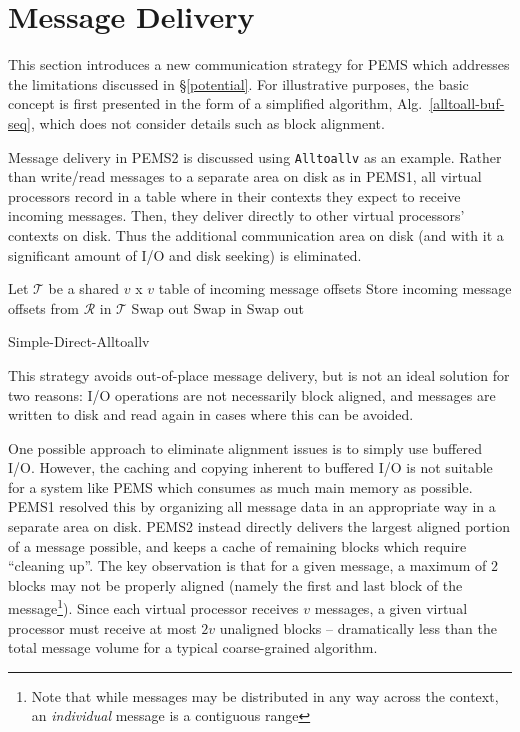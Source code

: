 \documentclass[12pt]{carletoncsthesis}
\begin{document}
\section{Message Delivery}
\label{delivery}


This section introduces a new communication strategy for PEMS which addresses
the limitations discussed in \S\ref{potential}.  For illustrative purposes,
the basic concept is first presented in the form of a simplified algorithm,
Alg.~\ref{alltoall-buf-seq}, which does not consider details such as block
alignment.

Message delivery in PEMS2 is discussed using {\tt Alltoallv} as an example.
Rather than write/read messages to a separate area on disk as in PEMS1,
all virtual processors record in a table where in their contexts they expect
to receive incoming messages.  Then, they deliver directly to other virtual
processors' contexts on disk.  Thus the additional communication area on disk
(and with it a significant amount of I/O and disk seeking) is eliminated.

\begin{algorithm}[h]
\BlankLine
Let $\mathcal{T}$ be a shared $v$ x $v$ table of incoming message offsets
\BlankLine
{}
	Store incoming message offsets from $\mathcal{R}$ in $\mathcal{T}$\;
	Swap out\;
\BlankLine{}
\BlankLine
{}
	Swap in\;
	Swap out\;
\BlankLine{}\BlankLine
\caption{\sc Simple-Direct-Alltoallv}
\label{alltoall-buf-seq}
\end{algorithm}

This strategy avoids out-of-place message delivery, but is not an ideal
solution for two reasons: I/O operations are not necessarily block aligned, and
messages are written to disk and read again in cases where this can be avoided.

One possible approach to eliminate alignment issues is to simply use
buffered I/O.  However, the caching and copying inherent to buffered I/O is not
suitable for a system like PEMS which consumes as much main memory as possible.
PEMS1 resolved this by organizing all message data in an appropriate way in a
separate area on disk.  PEMS2 instead directly delivers the largest aligned
portion of a message possible, and keeps a cache of remaining blocks which
require ``cleaning up''.  The key observation is that for a given message, a
maximum of $2$ blocks may not be properly aligned (namely the first and last
block of the message\footnote{Note that while messages may be distributed
in any way across the context, an {\em individual} message is a contiguous
range}).  Since each virtual processor receives $v$ messages, a given virtual
processor must receive at most $2v$ unaligned blocks -- dramatically
less than the total message volume for a typical coarse-grained algorithm.
\end{document}
